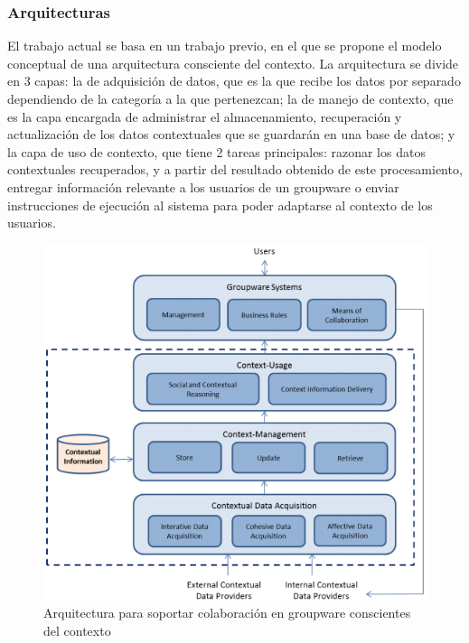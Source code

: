 \subsubsection{Arquitecturas}

El trabajo actual se basa en un trabajo previo\cite{montane2013context}, en el que se propone el modelo conceptual de una arquitectura consciente del contexto. La arquitectura se divide en 3 capas: la de adquisici\'on de datos, que es la que recibe los datos por separado dependiendo de la categor\'ia a la que pertenezcan; la de manejo de contexto, que es la capa encargada de administrar el almacenamiento, recuperaci\'on y actualizaci\'on de los datos contextuales que se guardar\'an en una base de datos; y la capa de uso de contexto, que tiene 2 tareas principales: razonar los datos contextuales recuperados, y a partir del resultado obtenido de este procesamiento, entregar informaci\'on relevante a los usuarios de un groupware o enviar instrucciones de ejecuci\'on al sistema para poder adaptarse al contexto de los usuarios.

\begin{figure}[h!]
  \centering
  \includegraphics[scale=0.6]{images/arch}
  \caption{Arquitectura para soportar colaboraci\'on en groupware conscientes del contexto \cite{montane2013context}}
\end{figure}

